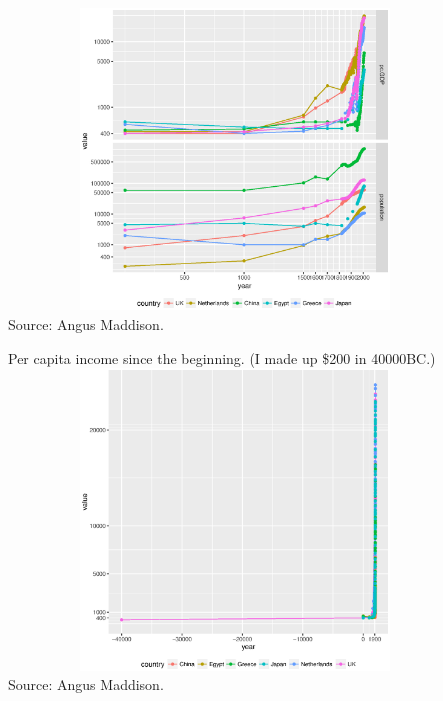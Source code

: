\begin{frame}{}
\hfil\includegraphics[clip, width = 12cm, height = 8cm]{1/world_income_pop_1-2009.eps}\\
Source: Angus Maddison.
\end{frame}
\begin{frame}{}
Per capita income since the beginning. (I made up \$200 in 40000BC.)\\
\hfil\includegraphics[clip, width = 12cm, height = 8cm]{1/world_income_pop_-40000-2009.eps}\\
Source: Angus Maddison.
\end{frame}

